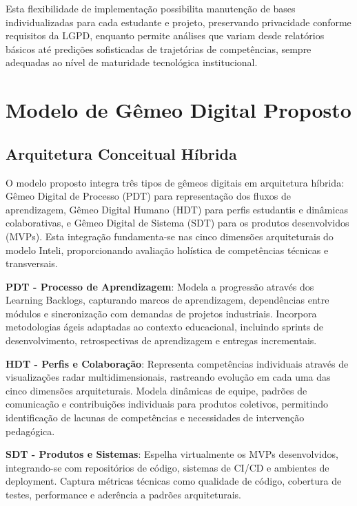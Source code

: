 \documentclass[english, spanish, brazilian]{RBIEarticle} %
\begin{document}
Esta flexibilidade de implementação possibilita manutenção de bases
individualizadas para cada estudante e projeto, preservando privacidade
conforme requisitos da LGPD, enquanto permite análises que variam desde
relatórios básicos até predições sofisticadas de trajetórias de competências,
sempre adequadas ao nível de maturidade tecnológica institucional.

\section{Modelo de Gêmeo Digital Proposto}

\subsection{Arquitetura Conceitual Híbrida}

\indent

O modelo proposto integra três tipos de gêmeos digitais em arquitetura híbrida:
Gêmeo Digital de Processo (PDT) para representação dos fluxos de aprendizagem,
Gêmeo Digital Humano (HDT) para perfis estudantis e dinâmicas colaborativas, e
Gêmeo Digital de Sistema (SDT) para os produtos desenvolvidos (MVPs). Esta
integração fundamenta-se nas cinco dimensões arquiteturais do modelo Inteli,
proporcionando avaliação holística de competências técnicas e transversais.

\textbf{PDT - Processo de Aprendizagem}: Modela a progressão através dos Learning Backlogs, capturando marcos de aprendizagem, dependências entre módulos e sincronização com demandas de projetos industriais. Incorpora metodologias ágeis adaptadas ao contexto educacional, incluindo sprints de desenvolvimento, retrospectivas de aprendizagem e entregas incrementais.

\textbf{HDT - Perfis e Colaboração}: Representa competências individuais através de visualizações radar multidimensionais, rastreando evolução em cada uma das cinco dimensões arquiteturais. Modela dinâmicas de equipe, padrões de comunicação e contribuições individuais para produtos coletivos, permitindo identificação de lacunas de competências e necessidades de intervenção pedagógica.

\textbf{SDT - Produtos e Sistemas}: Espelha virtualmente os MVPs desenvolvidos, integrando-se com repositórios de código, sistemas de CI/CD e ambientes de deployment. Captura métricas técnicas como qualidade de código, cobertura de testes, performance e aderência a padrões arquiteturais.
\end{document}
